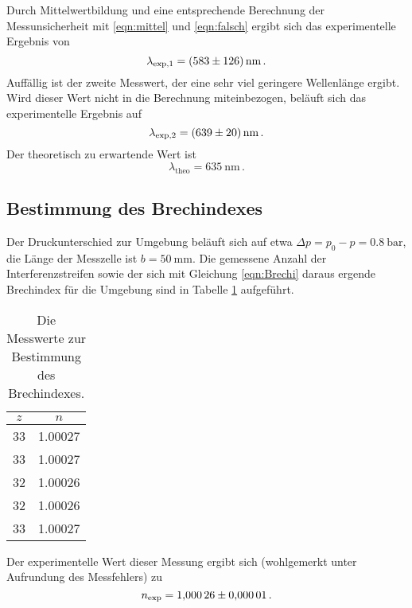 Durch Mittelwertbildung und eine entsprechende Berechnung der Messunsicherheit mit \eqref{eqn:mittel} und \eqref{eqn:falsch} 
ergibt sich das experimentelle Ergebnis von 
\begin{equation}
    \lambda_\text{exp,1} = \SI{583+-126}{\nano\meter} \,. 
\end{equation}
Auffällig ist der zweite Messwert, der eine sehr viel geringere Wellenlänge ergibt. Wird dieser Wert nicht in die Berechnung miteinbezogen, 
beläuft sich das experimentelle Ergebnis auf
\begin{equation}
    \lambda_\text{exp,2} = \SI{639+-20}{\nano\meter} \,.
\end{equation}
Der theoretisch zu erwartende Wert ist 
\begin{equation}
    \lambda_\text{theo}=\SI{635}{\nano\meter}\,.
\end{equation}

\subsection{Bestimmung des Brechindexes}

Der Druckunterschied zur Umgebung beläuft sich auf etwa $\Delta p=p_0-p=\SI{0.8}{\bar}$, die Länge der Messzelle ist $b=\SI{50}{\milli\meter}$. 
Die gemessene Anzahl der Interferenzstreifen sowie der sich mit Gleichung \eqref{eqn:Brechi} daraus ergende Brechindex für die Umgebung sind 
in Tabelle \ref{tab:Brech} aufgeführt. 

\begin{table}
    \centering
    \caption{Die Messwerte zur Bestimmung des Brechindexes.}
    \label{tab:Brech}
    \begin{tabular}{c c}
        \toprule
        $z$ & $n$ \\
        \midrule
        33 & 1.00027 \\
        33 & 1.00027 \\
        32 & 1.00026 \\
        32 & 1.00026 \\
        33 & 1.00027 \\
        \bottomrule
    \end{tabular}
\end{table}

Der experimentelle Wert dieser Messung ergibt sich (wohlgemerkt unter Aufrundung des Messfehlers) zu 
\begin{equation}
    n_\text{exp}=\num{1.00026+-0.00001}\,.
\end{equation}